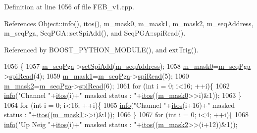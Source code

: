 Definition at line 1056 of file F\+E\+B\+\_\+v1.\+cpp.



References Object\+::info(), itos(), m\+\_\+mask0, m\+\_\+mask1, m\+\_\+mask2, m\+\_\+seq\+Address, m\+\_\+seq\+Pga, Seq\+P\+G\+A\+::set\+Spi\+Add(), and Seq\+P\+G\+A\+::spi\+Read().



Referenced by B\+O\+O\+S\+T\+\_\+\+P\+Y\+T\+H\+O\+N\+\_\+\+M\+O\+D\+U\+L\+E(), and ext\+Trig().


\begin{DoxyCode}
1056                     \{
1057   \hyperlink{classFEB__v1_a6c7804ac86796f233a8393043adf2e77}{m\_seqPga}->\hyperlink{classSeqPGA_ac998ce3a6d9b5f2e88cc8393f8c1df53}{setSpiAdd}(\hyperlink{classFEB__v1_a1c1eb093fd1733b9510fcf8bc5c7ad08}{m\_seqAddress});
1058   \hyperlink{classFEB__v1_ab49d6a271bdfddd9c7fac9435e4e686d}{m\_mask0}=\hyperlink{classFEB__v1_a6c7804ac86796f233a8393043adf2e77}{m\_seqPga}->\hyperlink{classSeqPGA_ab3d0e5e5d4014bc7a92588a76b8713d4}{spiRead}(4);
1059   \hyperlink{classFEB__v1_a1cbadb02155e2defdff6d6c8f70eb945}{m\_mask1}=\hyperlink{classFEB__v1_a6c7804ac86796f233a8393043adf2e77}{m\_seqPga}->\hyperlink{classSeqPGA_ab3d0e5e5d4014bc7a92588a76b8713d4}{spiRead}(5);
1060   \hyperlink{classFEB__v1_a25f03f6de00618dd575fc1f77a9af9ee}{m\_mask2}=\hyperlink{classFEB__v1_a6c7804ac86796f233a8393043adf2e77}{m\_seqPga}->\hyperlink{classSeqPGA_ab3d0e5e5d4014bc7a92588a76b8713d4}{spiRead}(6);
1061   \textcolor{keywordflow}{for} (\textcolor{keywordtype}{int} i = 0; i<16; ++i)\{
1062     \hyperlink{classObject_a644fd329ea4cb85f54fa6846484b84a8}{info}(\textcolor{stringliteral}{"Channel "}+\hyperlink{Tools_8h_af330027dbdafb9a30768b3613c553e60}{itos}(i)+\textcolor{stringliteral}{" masked status : "}+\hyperlink{Tools_8h_af330027dbdafb9a30768b3613c553e60}{itos}((\hyperlink{classFEB__v1_ab49d6a271bdfddd9c7fac9435e4e686d}{m\_mask0}>>i)&1));
1063   \}
1064   \textcolor{keywordflow}{for} (\textcolor{keywordtype}{int} i = 0; i<16; ++i)\{
1065     \hyperlink{classObject_a644fd329ea4cb85f54fa6846484b84a8}{info}(\textcolor{stringliteral}{"Channel "}+\hyperlink{Tools_8h_af330027dbdafb9a30768b3613c553e60}{itos}(i+16)+\textcolor{stringliteral}{" masked status : "}+\hyperlink{Tools_8h_af330027dbdafb9a30768b3613c553e60}{itos}((\hyperlink{classFEB__v1_a1cbadb02155e2defdff6d6c8f70eb945}{m\_mask1}>>i)&1));
1066   \}  
1067   \textcolor{keywordflow}{for} (\textcolor{keywordtype}{int} i = 0; i<4; ++i)\{
1068     \hyperlink{classObject_a644fd329ea4cb85f54fa6846484b84a8}{info}(\textcolor{stringliteral}{"Up Neig "}+\hyperlink{Tools_8h_af330027dbdafb9a30768b3613c553e60}{itos}(i)+\textcolor{stringliteral}{" masked status : "}+\hyperlink{Tools_8h_af330027dbdafb9a30768b3613c553e60}{itos}((\hyperlink{classFEB__v1_a25f03f6de00618dd575fc1f77a9af9ee}{m\_mask2}>>(i+12))&1));

\end{DoxyCode}
